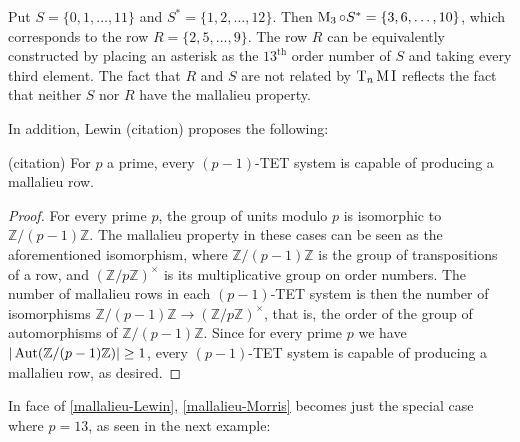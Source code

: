 \begin{example}
	Put $S = \{ 0, 1, \dots, 11 \}$ and $S^* = \{ 1, 2, \dots, 12 \}$. Then
	$\operatorname{M}_3 \circ S^* = \{ 3, 6, \dots, 10 \}$, which corresponds to the row
	$R = \{ 2, 5, \dots, 9 \}$. The row $R$ can be equivalently constructed by placing
	an asterisk as the $13^\text{th}$ order number of $S$ and taking every third element.
	The fact that $R$ and $S$ are not related by $\operatorname{T}_n\operatorname{M}\operatorname{I}$ reflects the fact that neither
	$S$ nor $R$ have the mallalieu property.
\end{example}

In addition, Lewin (citation) proposes the following:

\begin{proposition}
	\label{mallalieu-Lewin}
	(citation)
	For $p$ a prime, every $(p - 1)$-TET system is capable of producing a mallalieu row.
	\begin{proof}
		For every prime $p$, the group of units modulo $p$ is isomorphic to
		$\mathbb{Z} / (p - 1) \mathbb{Z}$. The mallalieu property in these cases can be
		seen as the aforementioned isomorphism, where $\mathbb{Z} / (p - 1) \mathbb{Z}$
		is the group of transpositions of a row, and $(\mathbb{Z} / p \mathbb{Z})^\times$
		is its multiplicative group on order numbers. The number of mallalieu rows in each
		$(p - 1)$-TET system is then the number of isomorphisms
		$\mathbb{Z} / (p - 1) \mathbb{Z} \to (\mathbb{Z} / p \mathbb{Z})^\times$, that is,
		the order of the group of automorphisms of $\mathbb{Z} / (p - 1) \mathbb{Z}$.
		Since for every prime $p$ we have $|\operatorname{Aut}(\mathbb{Z} / (p - 1) \mathbb{Z})| \geq 1$,
		every $(p - 1)$-TET system is capable of producing a mallalieu row, as desired.
	\end{proof}
\end{proposition}

In face of \ref{mallalieu-Lewin}, \ref{mallalieu-Morris} becomes just the special case
where $p = 13$, as seen in the next example:

